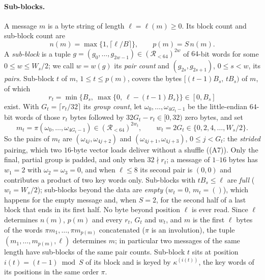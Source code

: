 \paragraph{Sub-blocks.}
A message $m$ is a byte string of length $\ell=\ell(m)\ge0$.  Its block count
and sub-block count are
\[
  n(m)=\max\{1,\lceil \ell/B\rceil\},\qquad p(m)=S\,n(m).
\]
A \emph{sub-block} is a tuple $g=(g_0,\dots,g_{2w-1})\in(\mathcal R_{<64})^{2w}$
of $64$-bit words for some $0\le w\le W_s/2$; we call $w=w(g)$ its \emph{pair
count} and $(g_{2s},g_{2s+1})$, $0\le s<w$, its \emph{pairs}.
Sub-block $t$ of $m$, $1\le t\le p(m)$, covers the bytes $[(t-1)B_s,\,tB_s)$
of $m$, of which
\[
  r_t=\min\bigl\{B_s,\ \max\{0,\ \ell-(t-1)B_s\}\bigr\}\in[0,B_s]
\]
exist.  With $G_t=\lceil r_t/32\rceil$ its \emph{group count}, let
$\omega_0,\dots,\omega_{4G_t-1}$ be the little-endian $64$-bit words of those
$r_t$ bytes followed by $32G_t-r_t\in[0,32)$ zero bytes, and set
\[
  m_t=\pi(\omega_0,\dots,\omega_{4G_t-1})\in(\mathcal R_{<64})^{2w_t},\qquad
  w_t=2G_t\in\{0,2,4,\dots,W_s/2\} .
\]
So the pairs of $m_t$ are $(\omega_{4j},\omega_{4j+2})$ and
$(\omega_{4j+1},\omega_{4j+3})$, $0\le j<G_t$: the \emph{strided} pairing,
which two $16$-byte vector loads deliver without a shuffle
((A7)).  Only the final, partial group is padded, and only
when $32\nmid r_t$; a message of $1$--$16$ bytes has $w_1=2$ with
$\omega_2=\omega_3=0$, and when $\ell\le8$ its second pair is $(0,0)$ and
contributes a product of two key words only.  Sub-blocks with $tB_s\le\ell$
are \emph{full} ($w_t=W_s/2$);
sub-blocks beyond the data are \emph{empty} ($w_t=0$, $m_t=()$), which happens
for the empty message and, when $S=2$, for the second half of a last block
that ends in its first half.  No byte beyond position $\ell$ is ever read.
Since $\ell$ determines $n(m)$, $p(m)$ and every $r_t$, $G_t$ and $w_t$, and
$m$ is the first $\ell$ bytes of the words $\pi m_1,\dots,\pi m_{p(m)}$
concatenated ($\pi$ is an involution), the tuple
$(m_1,\dots,m_{p(m)},\ell)$ determines $m$; in particular two messages of the
same length have sub-blocks of the same pair counts.  Sub-block $t$ sits at
position $i(t)=(t-1)\bmod S$ of its block and is keyed by $\kappa^{(i(t))}$,
the key words of its positions in the same order $\pi$.

